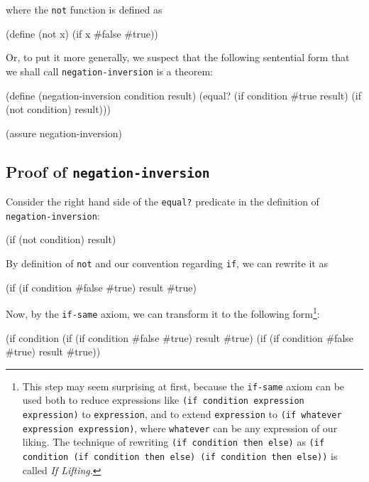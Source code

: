 where the \texttt{not} function is defined as
\begin{Snippet}
  (define (not x)
    (if x #false #true))
\end{Snippet}

Or, to put it more generally, we suspect that the following sentential
form that we shall call \texttt{negation-inversion} is a theorem:

\begin{Snippet}
  (define (negation-inversion condition result)
    (equal? (if condition #true result)
            (if (not condition) result)))

  (assure negation-inversion)
\end{Snippet}

\subsection{Proof of \texttt{negation-inversion}}

Consider the right hand side of the \texttt{equal?} predicate in the
definition of \texttt{negation-inversion}:

\begin{Snippet}
  (if (not condition) result)
\end{Snippet}

By definition of \texttt{not} and our convention regarding
\texttt{if}, we can rewrite it as

\begin{Snippet}
  (if (if condition #false #true) result #true)
\end{Snippet}

Now, by the \texttt{if-same} axiom, we can transform it to the following
form\footnote{
  This step may seem surprising at first, because the \texttt{if-same}
  axiom can be used both to reduce expressions like \texttt{(if condition
    expression expression)} to \texttt{expression}, and to extend
  \texttt{expression} to \texttt{(if whatever expression expression)},
  where \texttt{whatever} can be any expression of our liking. The
  technique of rewriting \texttt{(if condition then else)} as
  \texttt{(if condition (if condition then else) (if condition then else))}
  is called \textit{If Lifting}\cite{FriedmanEastlund2015}.
}:

\begin{Snippet}
  (if condition
      (if (if condition #false #true) result #true)
      (if (if condition #false #true) result #true))
\end{Snippet}

